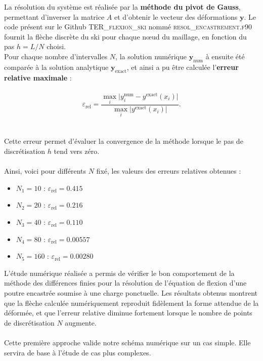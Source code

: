 \documentclass[12pt, a4paper]{article}
\begin{document}
La résolution du système est réalisée par la \textbf{méthode du pivot de Gauss}, permettant d’inverser la matrice $A$ et d’obtenir le vecteur des déformations $\mathbf{y}$.  
Le code présent sur le Github \textsc{TER\_flexion\_ski} nommé \textsc{resol\_encastrement.f90} fournit la flèche discrète du ski pour chaque nœud du maillage, en fonction du pas $h = L/N$ choisi.
\\
Pour chaque nombre d’intervalles $N$, la solution numérique $\mathbf{y}_{\text{num}}$ à ensuite été comparée à la solution analytique $\mathbf{y}_{\text{exact}}$, et ainsi a pu être calculée l’\textbf{erreur relative maximale} :
\\\\
\[
\varepsilon_{\text{rel}} = \frac{\max_i \big|y^{\text{num}}_i - y^{\text{exact}}(x_i)\big|}{\max_i \big|y^{\text{exact}}(x_i)\big|}.
\]
\\\\
Cette erreur permet d’évaluer la convergence de la méthode lorsque le pas de discrétisation $h$ tend vers zéro.  
\\\\
Ainsi, voici pour différents $N$ fixé, les valeurs des erreurs relatives obtenues : 
\\
\begin{itemize}
    \item[\textbullet]$N_1 = 10$ : $\varepsilon_{\text{rel}} = 0.415$
    \item[\textbullet]$N_2 = 20$ : $\varepsilon_{\text{rel}} = 0.216$
    \item[\textbullet]$N_3 = 40$ : $\varepsilon_{\text{rel}} = 0.110$
    \item[\textbullet]$N_4 = 80$ : $\varepsilon_{\text{rel}} = 0.00557$
    \item[\textbullet]$N_5 = 160$ : $\varepsilon_{\text{rel}} = 0.00280$
\end{itemize}

\vspace{1em}

L’étude numérique réalisée a permis de vérifier le bon comportement de la méthode des différences finies pour la résolution de l’équation de flexion d’une poutre encastrée soumise à une charge ponctuelle.  
Les résultats obtenus montrent que la flèche calculée numériquement reproduit fidèlement la forme attendue de la déformée, et que l’erreur relative diminue fortement lorsque le nombre de points de discrétisation $N$ augmente.  
\\\\
Cette première approche valide notre schéma numérique sur un cas simple. Elle servira de base à l’étude de cas plus complexes. 
\end{document}
